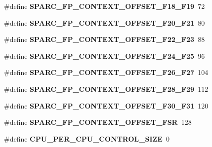 \begin{DoxyCompactItemize}
\#define {\bfseries S\+P\+A\+R\+C\+\_\+\+F\+P\+\_\+\+C\+O\+N\+T\+E\+X\+T\+\_\+\+O\+F\+F\+S\+E\+T\+\_\+\+F18\+\_\+\+F19}~72
\item 
\mbox{\label{group__RTEMSScoreCPUSPARC_ga79298b31d1497b99628274cc9f645cc0}} 
\#define {\bfseries S\+P\+A\+R\+C\+\_\+\+F\+P\+\_\+\+C\+O\+N\+T\+E\+X\+T\+\_\+\+O\+F\+F\+S\+E\+T\+\_\+\+F20\+\_\+\+F21}~80
\item 
\mbox{\label{group__RTEMSScoreCPUSPARC_gab3eb742ea11dbb73f47ab2b1fcfe926e}} 
\#define {\bfseries S\+P\+A\+R\+C\+\_\+\+F\+P\+\_\+\+C\+O\+N\+T\+E\+X\+T\+\_\+\+O\+F\+F\+S\+E\+T\+\_\+\+F22\+\_\+\+F23}~88
\item 
\mbox{\label{group__RTEMSScoreCPUSPARC_gae6d49297eea74b65b0816410c2709374}} 
\#define {\bfseries S\+P\+A\+R\+C\+\_\+\+F\+P\+\_\+\+C\+O\+N\+T\+E\+X\+T\+\_\+\+O\+F\+F\+S\+E\+T\+\_\+\+F24\+\_\+\+F25}~96
\item 
\mbox{\label{group__RTEMSScoreCPUSPARC_ga8957b7d421ef51c1b019be56583fa17a}} 
\#define {\bfseries S\+P\+A\+R\+C\+\_\+\+F\+P\+\_\+\+C\+O\+N\+T\+E\+X\+T\+\_\+\+O\+F\+F\+S\+E\+T\+\_\+\+F26\+\_\+\+F27}~104
\item 
\mbox{\label{group__RTEMSScoreCPUSPARC_ga0db0883285d8e68da055edb4685c3844}} 
\#define {\bfseries S\+P\+A\+R\+C\+\_\+\+F\+P\+\_\+\+C\+O\+N\+T\+E\+X\+T\+\_\+\+O\+F\+F\+S\+E\+T\+\_\+\+F28\+\_\+\+F29}~112
\item 
\mbox{\label{group__RTEMSScoreCPUSPARC_ga8c065331acf456a739202da7a4d13eb0}} 
\#define {\bfseries S\+P\+A\+R\+C\+\_\+\+F\+P\+\_\+\+C\+O\+N\+T\+E\+X\+T\+\_\+\+O\+F\+F\+S\+E\+T\+\_\+\+F30\+\_\+\+F31}~120
\item 
\mbox{\label{group__RTEMSScoreCPUSPARC_gac58742ce857392d615b4645c1347c869}} 
\#define {\bfseries S\+P\+A\+R\+C\+\_\+\+F\+P\+\_\+\+C\+O\+N\+T\+E\+X\+T\+\_\+\+O\+F\+F\+S\+E\+T\+\_\+\+F\+SR}~128
\item 
\mbox{\label{group__RTEMSScoreCPUSPARC_gaf8e38596ad3db49995fd8eb9fb4e86b2}} 
\#define {\bfseries C\+P\+U\+\_\+\+P\+E\+R\+\_\+\+C\+P\+U\+\_\+\+C\+O\+N\+T\+R\+O\+L\+\_\+\+S\+I\+ZE}~0

\end{DoxyCompactItemize}
